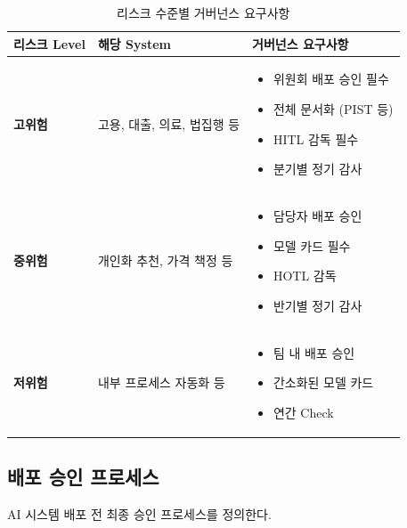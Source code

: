 \begin{table}[htbp]
\centering
\caption{리스크 수준별 거버넌스 요구사항}
\label{tab:risk_based_governance}
\begin{tabularx}{\textwidth}{p{2cm}p{3cm}X}
\toprule
\textbf{리스크 Level} & \textbf{해당 System} & \textbf{거버넌스 요구사항} \\
\midrule
\textbf{고위험} & 
고용, 대출, 의료, 법집행 등 & 
\begin{itemize}[nosep,leftmargin=*]
 \item 위원회 배포 승인 필수
 \item 전체 문서화 (PIST 등)
 \item HITL 감독 필수
 \item 분기별 정기 감사
\end{itemize} \\
\midrule
\textbf{중위험} & 
개인화 추천, 가격 책정 등 & 
\begin{itemize}[nosep,leftmargin=*]
 \item 담당자 배포 승인
 \item 모델 카드 필수
 \item HOTL 감독
 \item 반기별 정기 감사
\end{itemize} \\
\midrule
\textbf{저위험} & 
내부 프로세스 자동화 등 & 
\begin{itemize}[nosep,leftmargin=*]
 \item 팀 내 배포 승인
 \item 간소화된 모델 카드
 \item 연간 Check
\end{itemize} \\
\bottomrule
\end{tabularx}
\end{table}


\subsection{배포 승인 프로세스}
\label{sec:4.3.3}

AI 시스템 배포 전 최종 승인 프로세스를 정의한다.

